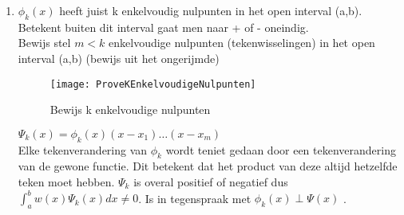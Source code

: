 \begin{enumerate}
\begin{enumerate}
\item $\phi_k(x)$ heeft juist k enkelvoudig nulpunten in het open interval (a,b). Betekent buiten dit interval gaat men naar + of - oneindig. \\
Bewijs stel $m<k$ enkelvoudige nulpunten (tekenwisselingen) in het open interval (a,b) (bewijs uit het ongerijmde) 
\begin{figure}[h]
	\centering
	\texttt{[image: ProveKEnkelvoudigeNulpunten]}
	\caption{Bewijs k enkelvoudige nulpunten}
\end{figure}

$\Psi_k(x)=\phi_k(x)(x-x_1)\ldots(x-x_m)$ \\
Elke tekenverandering van $\phi_k$ wordt teniet gedaan door een tekenverandering van de gewone functie. Dit betekent dat het product van deze altijd hetzelfde teken moet hebben. $\Psi_k$ is overal positief of negatief dus $\int_a^b w(x) \Psi_k(x) dx \neq 0$. Is in tegenspraak met $\phi_k(x) \perp \Psi(x)$ .

\end{enumerate}
\end{enumerate}





